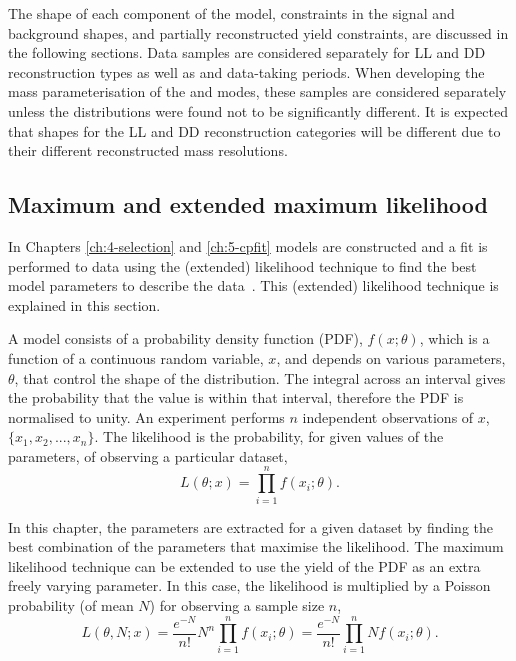 The shape of each component of the model, constraints in the signal and background shapes, and partially reconstructed yield constraints, are discussed in the following sections. Data samples are considered separately for LL and DD \KS reconstruction types as well as \runone and \runtwo data-taking periods. When developing the mass parameterisation of the \kpi and \kpipipi modes, these samples are considered separately unless the distributions were found not to be significantly different. It is expected that shapes for the LL and DD \KS reconstruction categories will be different due to their different reconstructed \Bm mass resolutions.

\subsection{Maximum and extended maximum likelihood}
\label{sec:massfit:likelihood}

In Chapters \ref{ch:4-selection} and \ref{ch:5-cpfit} models are constructed and a fit is performed to data  using the (extended) likelihood technique to find the best model parameters to describe the data~\cite{MLandEML,EML}. This (extended) likelihood technique is explained in this section.

A model consists of a probability density function (PDF), $f(x;\theta)$, which is a function of a continuous random variable, $x$, and depends on various parameters, $\theta$, that control the shape of the distribution. The integral across an interval gives the probability that the value is within that interval, therefore the PDF is normalised to unity. An experiment performs $n$ independent observations of $x$, $\{x_1, x_2, ..., x_n\}$. The likelihood is the probability, for given values of the parameters, of observing a particular dataset,
\begin{equation}
L(\theta;x) = \prod_{i=1}^{n} f(x_i;\theta).
\end{equation}

In this chapter, the parameters are extracted for a given dataset by finding the best combination of the parameters that maximise the likelihood. The maximum likelihood technique can be extended to use the yield of the PDF as an extra freely varying parameter. In this case, the likelihood is multiplied by a Poisson probability (of mean $N$) for observing a sample size $n$,
\begin{equation}
L(\theta, N;x) = \frac{e^{-N}}{n!}N^n \prod_{i=1}^{n} f(x_i;\theta) = \frac{e^{-N}}{n!} \prod_{i=1}^{n} N f(x_i;\theta).
\end{equation}

